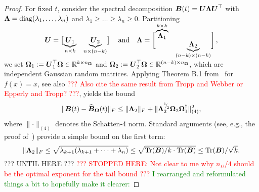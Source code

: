 \begin{proof}
For fixed $t$, consider the spectral decomposition $\boldsymbol{B}(t) = \boldsymbol{U} \boldsymbol{\Lambda} \boldsymbol{U}^{\top}$ with  
$\boldsymbol{\Lambda} = \operatorname{diag}(\lambda_1, \dots, \lambda_n)$ and $\lambda_1 \ge \dots \ge \lambda_n \ge 0$. Partitioning
    \begin{equation*}
        \rule[\dimexpr-2ex-\ht\strutbox]{0pt}{\dimexpr2ex+4ex+\baselineskip}
        \mtx{U} = \begin{bmatrix}
            \smash{\underbrace{\mtx{U}_1}_{n \times k}} & \smash{\underbrace{\mtx{U}_2}_{n \times (n-k)}}
        \end{bmatrix}
        \quad \text{and} \quad
        \mtx{\Lambda} =
        \begin{bmatrix}
            \smash{\overbrace{\mtx{\Lambda}_1}^{k \times k}} & \\ & \smash{\underbrace{\mtx{\Lambda}_2}_{(n-k) \times (n-k)}}
        \end{bmatrix},
    \end{equation*}
    we set
    $\boldsymbol{\Omega}_1 := \boldsymbol{U}_1^{\top} \boldsymbol{\Omega} \in \mathbb{R}^{k \times n_{\boldsymbol{\Omega}}}$ and $\boldsymbol{\Omega}_2 := \boldsymbol{U}_2^{\top} \boldsymbol{\Omega} \in \mathbb{R}^{(n - k) \times n_{\boldsymbol{\Omega}}}$, which are independent Gaussian random matrices.
Applying Theorem B.1 from~\cite{persson-2023-randomized-lowrank} for $f(x) = x$, see also \textcolor{red}{??? Also cite the same result from Tropp and Webber or Epperly and Tropp? ???}, yields the bound
    \begin{equation}
        \lVert \boldsymbol{B}(t) - \widehat{\boldsymbol{B}}_{\boldsymbol{\Omega}}(t) \rVert _F 
        \leq  \lVert \boldsymbol{\Lambda}_2 \rVert _F + \lVert \boldsymbol{\Lambda}_2^{{}^{1}{\mskip -5mu/\mskip -3mu}_{2}} \boldsymbol{\Omega}_2 \boldsymbol{\Omega}_1^{\dagger} \rVert _{(4)}^2,
        \label{equ:nystrom-proof-persson-bonud}
    \end{equation}
    where $\lVert \cdot \rVert _{(4)}$ denotes the Schatten-4 norm. Standard arguments (see, e.g., the proof of~\cite[Lemma 3]{meyer-2021-hutch-optimal}) provide a simple bound on the first term:
    \begin{equation}
        \lVert \boldsymbol{\Lambda}_2 \rVert _F
        \leq \sqrt{ \lambda_{k+1} (  \lambda_{k+1} + \cdots + \lambda_{n})}
        \leq \sqrt{ \operatorname{Tr}(\boldsymbol{B}) / k \cdot \operatorname{Tr}(\boldsymbol{B})}
        \leq \operatorname{Tr}(\boldsymbol{B}) / \sqrt{k}.
        \label{equ:nystrom-proof-frobenius-trace}
    \end{equation}
    ??? UNTIL HERE ???
    \textcolor{red}{??? STOPPED HERE: Not clear to me why $n_\Omega/4$ should be the optimal exponent for the tail bound ???} \textcolor{green}{I rearranged and reformulated things a bit to hopefully make it clearer:}
    

\end{proof}

